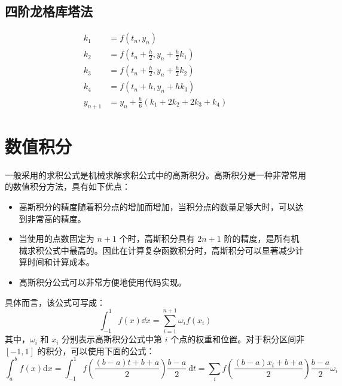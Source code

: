 \documentclass{article}
\numberwithin{equation}{subsection}    %
\begin{document}
\begin{appendix}
    \subsection{四阶龙格库塔法}
    \begin{equation}
        \begin{aligned}
            k_{1}   & =f\left(t_{n}, y_{n}\right)                                \\
            k_{2}   & =f\left(t_{n}+\frac{h}{2}, y_{n}+\frac{h}{2} k_{1}\right)  \\
            k_{3}   & =f\left(t_{n}+\frac{h}{2}, y_{n}+\frac{h}{2} k_{2}\right)  \\
            k_{4}   & =f\left(t_{n}+h, y_{n}+h k_{3}\right)                      \\
            y_{n+1} & =y_{n}+\frac{h}{6}\left(k_{1}+2 k_{2}+2 k_{3}+k_{4}\right)
        \end{aligned}
    \end{equation}
    \section{数值积分}
    一般采用的求积公式是机械求解求积公式中的高斯积分。高斯积分是一种非常常用的数值积分方法，具有如下优点：
    \begin{itemize}
        \item 高斯积分的精度随着积分点的增加而增加，当积分点的数量足够大时，可以达到非常高的精度。
        \item 当使用的点数固定为 $n+1$ 个时，高斯积分具有 $2n+1$ 阶的精度，是所有机械求积公式中最高的。因此在计算复杂函数积分时，高斯积分可以显著减少计算时间和计算成本。
        \item 高斯积分公式可以非常方便地使用代码实现。
    \end{itemize}
    具体而言，该公式可写成：
    \begin{equation}
        \int_{-1}^1 f(x)\dd x=\sum_{i=1}^{n+1}\omega_if(x_i)
    \end{equation}
    其中，$\omega_i$ 和 $x_i$ 分别表示高斯积分公式中第 $i$ 个点的权重和位置。对于积分区间非 $[-1,1]$ 的积分，可以使用下面的公式：
    \begin{equation}
        \int_{a}^{b} f(x) \mathrm{d} x=\int_{-1}^{1} f\left(\frac{(b-a) t+b+a}{2}\right) \frac{b-a}{2} \mathrm{~d} t=\sum_i f(\frac{(b-a)x_i+b+a}{2})\frac{b-a}{2}\omega_i
    \end{equation}


\end{appendix}
\end{document}
